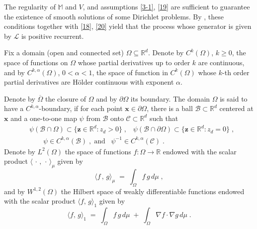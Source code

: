 \documentclass[reqno]{amsart}
\newcounter{as}[section]
\newcommand{\mc}[1]{{\mathcal #1}}
\newcommand{\bb}[1]{{\mathbb #1}}
\newcommand{\bs}[1]{{\boldsymbol #1}}
\newcommand{\<}{\langle}
\renewcommand{\>}{\rangle}
\begin{document}
The regularity of $\bb M$ and $V$, and assumptions \eqref{3-1},
\eqref{19} are sufficient to guarantee the existence of smooth
solutions of some Dirichlet problems. By \cite[Theorem~6.1.3]{p95}, these conditions together with \eqref{18}, \eqref{20} yield that the process whose generator is given by $\mc L$ is positive recurrent.

\smallskip{}  Fix a domain (open and connected set) $\Omega \subseteq\bb R^d$. Denote by $C^k(\Omega)$, $k\ge 0$, the space of functions on $\Omega$ whose partial derivatives
up to order $k$ are continuous, and by $C^{k,\alpha}(\Omega)$, $0<\alpha <1$, the space of function in $C^k(\Omega)$ whose $k$-th order partial derivatives are H\"older continuous with exponent $\alpha$.

Denote by $\overline{\Omega}$ the closure of $\Omega$ and by $\partial
\Omega$ its boundary.  The domain $\Omega$ is said to have a
$C^{k,\alpha}$-boundary, if for each point $\bs x\in\partial\Omega$,
there is a ball $\mc B\subset \bb R^d$ centered at $\bs x$ and a
one-to-one map $\psi$ from $\mc B$ onto $\mc C\subset \bb R^d$ such
that
\begin{align*}
&\psi(\mc B \cap \Omega) \subset \{\bs
z\in\bb R^d : z_d >0\}\;,\;\;\;\psi(\mc B \cap \partial\Omega) \subset \{\bs
z\in\bb R^d : z_d =0\}\;,\\
&\qquad \psi \in C^{k,\alpha} (\mc B)\;,\;\mbox{and}\;\;\; \psi^{-1} \in
C^{k,\alpha} (\mc C)\;.
\end{align*}
Denote by $L^2(\Omega)$ the space of functions $f\colon\Omega \to \bb R$
endowed with the scalar product $\<\,\cdot\,, \,\cdot\,\>_\mu$ given
by
\begin{equation*}
\< f\,,\, g\>_\mu \;=\; \int_{\Omega} f\, g\, d\mu\;,
\end{equation*}
and by $W^{1,2}(\Omega)$ the Hilbert space of weakly differentiable
functions endowed with the scalar product $\<f,\,g\>_1$ given by
\begin{equation*}
\< f ,\, g\>_1 \;=\; \int_{\Omega}  f \, g \, d \mu \;+\;
\int_{\Omega} \nabla f \cdot \nabla g \, d \mu \;.
\end{equation*}
\end{document}
